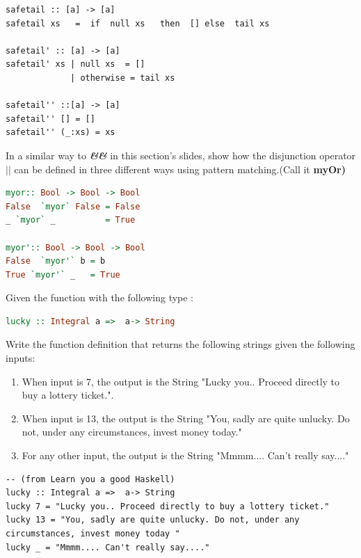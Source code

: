 \documentclass{article}
\begin{document}
\begin{Answer}
\begin{lstlisting}
safetail :: [a] -> [a]
safetail xs   =  if  null xs   then  [] else  tail xs

safetail' :: [a] -> [a]
safetail' xs | null xs  = []
             | otherwise = tail xs

safetail'' ::[a] -> [a]
safetail'' [] = []
safetail'' (_:xs) = xs
\end{lstlisting}
\end{Answer}
\begin{Exercise} 
In a similar way to \hspace {.5cm }\textbf{\textit{\&\hspace{-.5cm}\&}} \hspace{.5cm} in this section's slides, 
show how the disjunction operator \textbf{$\vert\vert$ } can be defined in three different ways using pattern matching.(Call it \textbf{myOr)}
\end{Exercise}
\begin{Answer}
\begin{lstlisting}[language=Haskell]
myor:: Bool -> Bool -> Bool
False  `myor` False = False
_ `myor` _          = True

myor':: Bool -> Bool -> Bool
False  `myor'` b = b
True `myor'` _   = True
\end{lstlisting}
\end{Answer}
\pagebreak
\begin{Exercise} 
Given the function with the following type :
\begin{lstlisting}[language=Haskell]
 lucky :: Integral a =>  a-> String
\end{lstlisting}
Write the function definition that returns the following strings given the following inputs:
\begin{enumerate}
 \item When input is 7, the output is the String "Lucky you.. Proceed directly to buy a lottery ticket.".
 \item When input is 13, the output is the String "You, sadly are quite unlucky. Do not, under any circumstances, invest money today."
 \item For any other input, the output is the String "Mmmm.... Can't really say...."
 \end{enumerate}
\end{Exercise}
\begin{Answer}
\begin{lstlisting}
-- (from Learn you a good Haskell)
lucky :: Integral a =>  a-> String
lucky 7 = "Lucky you.. Proceed directly to buy a lottery ticket."
lucky 13 = "You, sadly are quite unlucky. Do not, under any circumstances, invest money today "
lucky _ = "Mmmm.... Can't really say...."
\end{lstlisting}
\end{Answer}
\end{document}
